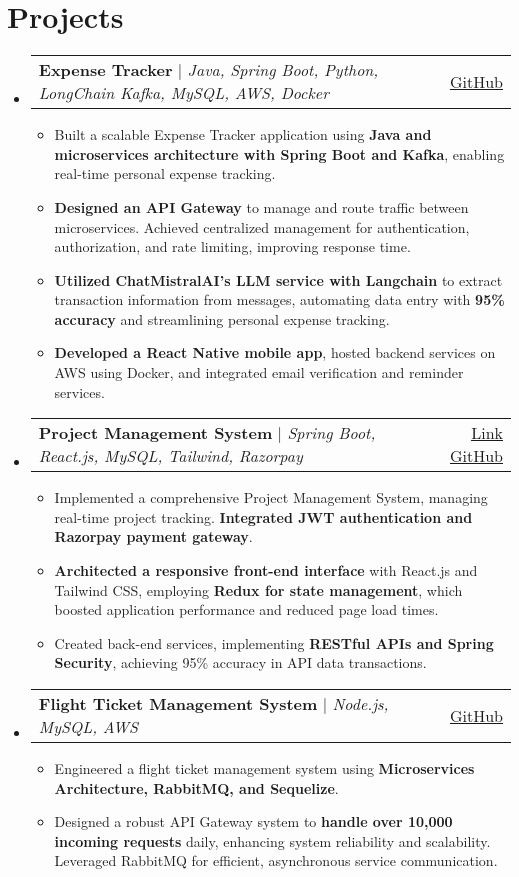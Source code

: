 \documentclass[a4paper,11pt]{article}
\makeatletter
\newcommand{\resumeItem}[1]{
  \item\small{
    {#1 \vspace{-2pt}}
  }
}
\newcommand{\resumeProjectHeading}[2]{
    \item
    \begin{tabular*}{0.97\textwidth}{l@{\extracolsep{\fill}}r}
      \small#1 & #2 \\
    \end{tabular*}\vspace{-7pt}
}
\newcommand{\resumeItemListStart}{\begin{itemize}}
\newcommand{\resumeItemListEnd}{\end{itemize}\vspace{-5pt}}
\makeatother
\begin{document}
\noindent\section*{Projects}
    \begin{itemize}[leftmargin=0.15in, label={}]
    \resumeProjectHeading
        {\textbf{Expense Tracker} $|$ \emph{Java, Spring Boot, Python, LongChain Kafka, MySQL, AWS, Docker}}{\href{https://github.com/ubednama/Expense-Tracker-Authservice}{\underline{GitHub}}}
            \resumeItemListStart
                \resumeItem{Built a scalable Expense Tracker application using \textbf{Java and microservices architecture with Spring Boot and Kafka}, enabling real-time personal expense tracking.}
                \resumeItem{\textbf{Designed an API Gateway} to manage and route traffic between microservices. Achieved centralized management for authentication, authorization, and rate limiting, improving response time.}
                \resumeItem{\textbf{Utilized ChatMistralAI’s LLM service with Langchain} to extract transaction information from messages, automating data entry with \textbf{95\% accuracy} and streamlining personal expense tracking.}
                \resumeItem{\textbf{Developed a React Native mobile app}, hosted backend services on AWS using Docker, and integrated email verification and reminder services.}
            \resumeItemListEnd

    \vspace{3pt}
  \resumeProjectHeading
      {\textbf{Project Management System} $|$ \emph{Spring Boot, React.js, MySQL, Tailwind, Razorpay}}{\hfill  \href{https://project-management-system-frontend-rho.vercel.app/}{\underline{Link}} \textbar{} \href{https://github.com/ubednama/Project-Management-System}{\underline{GitHub}}}
      \resumeItemListStart
        \resumeItem{Implemented a comprehensive Project Management System, managing real-time project tracking. \textbf{Integrated JWT authentication and Razorpay payment gateway}.}
        \resumeItem{\textbf{Architected a responsive front-end interface} with React.js and Tailwind CSS, employing \textbf{Redux for state management}, which boosted application performance and reduced page load times.}
        \resumeItem{Created back-end services, implementing \textbf{RESTful APIs and Spring Security}, achieving 95\% accuracy in API data transactions.}
      \resumeItemListEnd

    \vspace{3pt}
    \resumeProjectHeading
      {\textbf{Flight Ticket Management System} $|$ \emph{Node.js, MySQL, AWS}}{\href{https://github.com/ubednama/Flights-Service} {\underline{GitHub}}}
      \resumeItemListStart
        \resumeItem{Engineered a flight ticket management system using \textbf{Microservices Architecture, RabbitMQ, and Sequelize}.}
        \resumeItem{Designed a robust API Gateway system to \textbf{handle over 10,000 incoming requests} daily, enhancing system reliability and scalability. Leveraged RabbitMQ for efficient, asynchronous service communication.}
      \resumeItemListEnd


\end{itemize}
\end{document}
